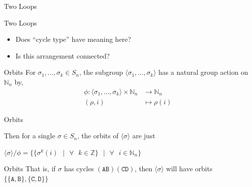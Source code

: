 \documentclass[hyphens,aspectratio=169]{beamer}
\begin{document}
\begin{frame}{Two Loops}
\begin{center}
{
		}

	\end{center}
\end{frame}

\begin{frame}{Two Loops}
	\begin{itemize}
		\item Does ``cycle type'' have meaning here?
		      \pause
		      \vspace{1em}
		\item Is this arrangement connected?
	\end{itemize}
\end{frame}

\begin{frame}{Orbits}
	For $\sigma_1,\dots,\sigma_k\in S_n$, the subgroup $\langle \sigma_1,\dots,\sigma_k \rangle$ has a natural group action on $\mathbb{N}_n$ by,
	\begin{align*}
		\phi: \langle \sigma_1,\dots,\sigma_k \rangle \times \mathbb{N}_n & \to \mathbb{N}_n \\
		(\rho, i)                                                         & \mapsto \rho(i)
	\end{align*}
\end{frame}

\begin{frame}{Orbits}

	Then for a single $\sigma\in S_n$, the orbits of $\langle\sigma\rangle$ are just
	\begin{center}
		$\langle\sigma\rangle/\phi = \{\{\sigma^k(i)\text{ }|\text{ }\forall\text{ }k\in\mathbb{Z}\}\text{ }|\text{ }\forall\text{ }i\in\mathbb{N}_n\}$
	\end{center}

\end{frame}
\begin{frame}{Orbits}
	That is, if $\sigma$ has cycles $(\texttt{AB})(\texttt{CD})$, then $\langle\sigma\rangle$ will have orbits $\{\{\texttt{A},\texttt{B}\},\{\texttt{C},\texttt{D}\}\}$
\end{frame}
\end{document}
